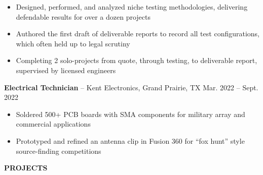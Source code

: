 \documentclass[18pt]{article}
\begin{document}
\begin{itemize}[noitemsep]
    \vspace{-0.5\baselineskip}
    \item Designed, performed, and analyzed niche testing methodologies, delivering defendable results for over a dozen projects
    \item Authored the first draft of deliverable reports to record all test configurations, which often held up to legal scrutiny 
    \item Completing 2 solo-projects from quote, through testing, to deliverable report, supervised by licensed engineers
\end{itemize}

\vspace{-0.5\baselineskip}
\textbf{Electrical Technician} – Kent Electronics, Grand Prairie, TX \hfill Mar. 2022 – Sept. 2022

\begin{itemize}[noitemsep]
    \vspace{-0.5\baselineskip}
    \item Soldered 500+ PCB boards with SMA components for military array and commercial applications
    \item Prototyped and refined an antenna clip in Fusion 360 for “fox hunt” style source-finding competitions
\end{itemize}

\vspace{-0.75\baselineskip}
\begin{center}
    \textbf{PROJECTS}
    \hrulefill
\end{center}
\vspace{-0.5\baselineskip}


\end{document}
